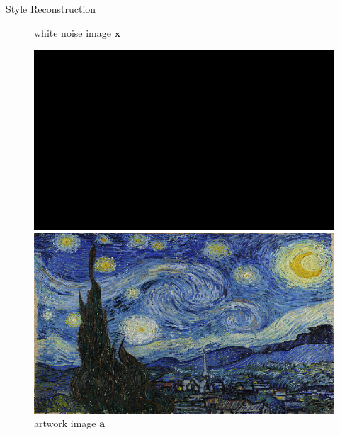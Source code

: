 \documentclass{beamer}
\begin{document}
\begin{frame}{Style Reconstruction}
\begin{figure}[ht]
    \begin{minipage}[b]{0.45\linewidth}
        \centering
        \caption*{white noise image $\mathbf{x}$}
        \includegraphics[width=\textwidth]{img/style/noise.png}
    \end{minipage}
    \hspace{0.5cm}
    \begin{minipage}[b]{0.45\linewidth}
        \centering
        \caption*{artwork image $\mathbf{a}$}
        \includegraphics[width=\textwidth]{img/style/starry_night.png}
    \end{minipage}
\end{figure}
\end{frame}
\end{document}
